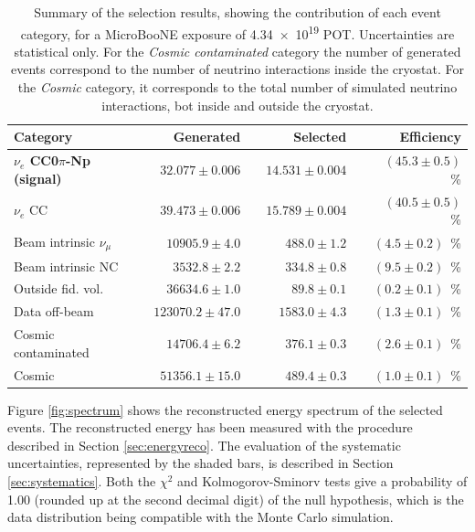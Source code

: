 \begin{table}[htbp]
   \centering
   \begin{tabular}{llrrrrr}
     \toprule
     Category & \phantom{a} & Generated & \phantom{a} & Selected & \phantom{a} & Efficiency \\
     \midrule

     \textbf{$\nu_{e}$ CC0$\pi$-Np (signal)}  & & $32.077\pm0.006$    & & $14.531\pm0.004$  & & $(45.3\pm0.5)$~\%\\
     $\nu_{e}$ CC                             & & $39.473\pm0.006$    & & $15.789\pm0.004$  & & $(40.5\pm0.5)$~\%\\
     Beam intrinsic $\nu_{\mu}$               & & $10905.9\pm4.0$   & & $488.0\pm1.2$   & & $(4.5\pm0.2)$~\%\\
     Beam intrinsic NC                        & & $3532.8\pm2.2$    & & $334.8\pm0.8$   & & $(9.5\pm0.2)$~\%\\
     Outside fid. vol.                        & & $36634.6\pm1.0$    & & $89.8\pm0.1$    & & $(0.2\pm0.1)$~\%\\
     Data off-beam                            & & $123070.2\pm47.0$ & & $1583.0\pm4.3$  & & $(1.3\pm0.1)$~\%\\
     Cosmic contaminated                      & & $14706.4\pm6.2$   & & $376.1\pm0.3$   & & $(2.6\pm0.1)$~\%\\ 
     Cosmic                                   & & $51356.1\pm15.0$  & & $489.4\pm0.3$   & & $(1.0\pm0.1)$~\%\\

     \bottomrule
   \end{tabular}
   \caption{Summary of the selection results, showing the contribution of each event category, for a MicroBooNE exposure of \num{4.34e19} POT. Uncertainties are statistical only. {For the \emph{Cosmic contaminated} category the number of generated events correspond to the number of neutrino interactions inside the cryostat. For the \emph{Cosmic} category, it corresponds to the total number of simulated neutrino interactions, bot inside and outside the cryostat.}}\label{tab:result}
\end{table}


Figure \ref{fig:spectrum} shows the reconstructed energy spectrum of the selected events. The reconstructed energy has been measured with the procedure described in Section \ref{sec:energyreco}. The evaluation of the systematic uncertainties, represented by the shaded bars, is described in Section \ref{sec:systematics}. Both the $\chi^2$ and Kolmogorov-Sminorv tests give a probability of 1.00 (rounded up at the second decimal digit)  of the null hypothesis, which is the data distribution being compatible with the Monte Carlo simulation.

